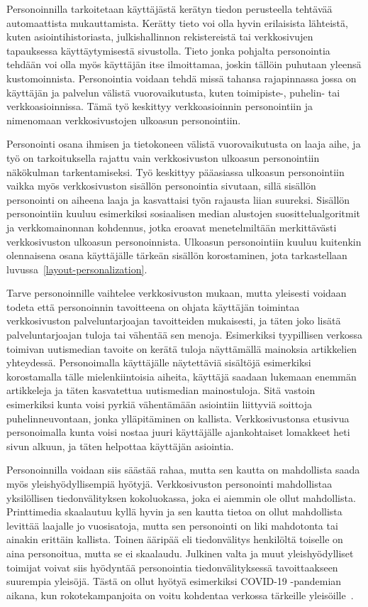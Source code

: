 \documentclass[finnish, 12pt, a4paper, elec, utf8, a-1b, online]{aaltothesis}
\begin{document}
Personoinnilla tarkoitetaan käyttäjästä kerätyn tiedon perusteella tehtävää
automaattista mukauttamista. Kerätty tieto voi olla hyvin erilaisista lähteistä,
kuten asiointihistoriasta, julkishallinnon rekistereistä tai verkkosivujen
tapauksessa käyttäytymisestä sivustolla. Tieto jonka pohjalta personointia
tehdään voi olla myös käyttäjän itse ilmoittamaa, joskin tällöin puhutaan
yleensä kustomoinnista. Personointia voidaan tehdä missä tahansa rajapinnassa
jossa on käyttäjän ja palvelun välistä vuorovaikutusta, kuten toimipiste-,
puhelin- tai verkkoasioinnissa. Tämä työ keskittyy verkkoasioinnin personointiin
ja nimenomaan verkkosivustojen ulkoasun personointiin.

Personointi osana ihmisen ja tietokoneen välistä vuorovaikutusta on laaja aihe,
ja työ on tarkoituksella rajattu vain verkkosivuston ulkoasun personointiin
näkökulman tarkentamiseksi. Työ keskittyy pääasiassa ulkoasun personointiin
vaikka myös verkkosivuston sisällön personointia sivutaan, sillä sisällön
personointi on aiheena laaja ja kasvattaisi työn rajausta liian suureksi.
Sisällön personointiin kuuluu esimerkiksi sosiaalisen median alustojen
suosittelualgoritmit ja verkkomainonnan kohdennus, jotka eroavat menetelmiltään
merkittävästi verkkosivuston ulkoasun personoinnista. Ulkoasun personointiin
kuuluu kuitenkin olennaisena osana käyttäjälle tärkeän sisällön korostaminen,
jota tarkastellaan luvussa~\ref{layout-personalization}.

Tarve personoinnille vaihtelee verkkosivuston mukaan, mutta yleisesti voidaan
todeta että personoinnin tavoitteena on ohjata käyttäjän toimintaa
verkkosivuston palveluntarjoajan tavoitteiden mukaisesti, ja täten joko lisätä
palveluntarjoajan tuloja tai vähentää sen menoja. Esimerkiksi tyypillisen
verkossa toimivan uutismedian tavoite on kerätä tuloja näyttämällä mainoksia
artikkelien yhteydessä. Personoimalla käyttäjälle näytettäviä sisältöjä
esimerkiksi korostamalla tälle mielenkiintoisia aiheita, käyttäjä saadaan
lukemaan enemmän artikkeleja ja täten kasvatettua uutismedian mainostuloja. Sitä
vastoin esimerkiksi kunta voisi pyrkiä vähentämään asiointiin liittyviä soittoja
puhelinneuvontaan, jonka ylläpitäminen on kallista. Verkkosivustonsa etusivua
personoimalla kunta voisi nostaa juuri käyttäjälle ajankohtaiset lomakkeet heti
sivun alkuun, ja täten helpottaa käyttäjän asiointia.

Personoinnilla voidaan siis säästää rahaa, mutta sen kautta on mahdollista saada
myös yleishyödyllisempiä hyötyjä. Verkkosivuston personointi mahdollistaa
yksilöllisen tiedonvälityksen kokoluokassa, joka ei aiemmin ole ollut
mahdollista. Printtimedia skaalautuu kyllä hyvin ja sen kautta tietoa on ollut
mahdollista levittää laajalle jo vuosisatoja, mutta sen personointi on liki
mahdotonta tai ainakin erittäin kallista. Toinen ääripää eli tiedonvälitys
henkilöltä toiselle on aina personoitua, mutta se ei skaalaudu. Julkinen valta
ja muut yleishyödylliset toimijat voivat siis hyödyntää personointia
tiedonvälityksessä tavoittaakseen suurempia yleisöjä. Tästä on ollut hyötyä
esimerkiksi COVID-19 -pandemian aikana, kun rokotekampanjoita on voitu kohdentaa
verkossa tärkeille yleisöille~\cite{viite?}.
\end{document}
